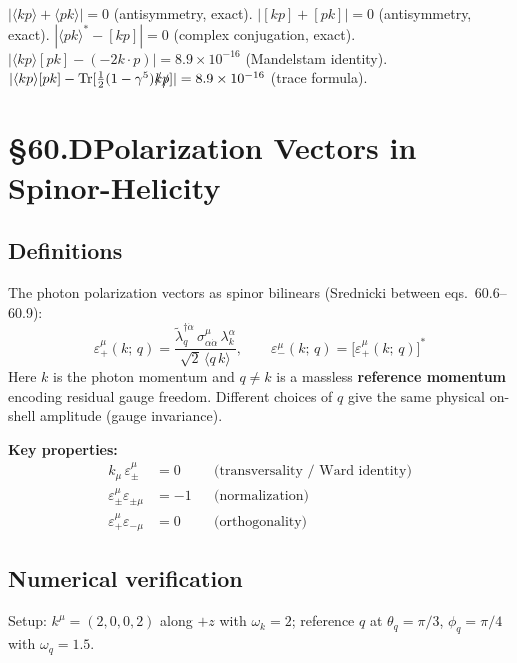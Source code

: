 \documentclass[12pt]{article}
\newcommand{\verified}[1]{\textcolor{verifygreen}{\checkmark\; #1}}
\begin{document}
\verified{$|\langle kp\rangle + \langle pk\rangle| = 0$ (antisymmetry, exact).}
\verified{$|[kp] + [pk]| = 0$ (antisymmetry, exact).}
\verified{$|\langle pk\rangle^* - [kp]| = 0$ (complex conjugation, exact).}
\verified{$|\langle kp\rangle[pk] - (-2k\cdot p)| = 8.9\times10^{-16}$ (Mandelstam identity).}
\verified{$|\langle kp\rangle[pk] - \mathrm{Tr}[\tfrac12(1-\gamma^5)\slashed{k}\slashed{p}]| = 8.9\times10^{-16}$ (trace formula).}

\section{§60.D\quad Polarization Vectors in Spinor-Helicity}

\subsection{Definitions}

The photon polarization vectors as spinor bilinears
(Srednicki between eqs.~60.6--60.9):
\begin{equation}
  \boxed{
    \varepsilon_+^\mu(k;\,q) = \frac{\tilde\lambda_q^{\dagger\dot\alpha}\,\sigma^\mu_{\alpha\dot\alpha}\,\lambda_k^\alpha}{\sqrt{2}\,\langle q\,k\rangle},
    \qquad
    \varepsilon_-^\mu(k;\,q) = \bigl[\varepsilon_+^\mu(k;\,q)\bigr]^*
  }
  \tag{60.6}
\end{equation}
Here $k$ is the photon momentum and $q\neq k$ is a massless \textbf{reference
momentum} encoding residual gauge freedom.  Different choices of $q$ give the
same physical on-shell amplitude (gauge invariance).

\textbf{Key properties:}
\begin{align}
  k_\mu\,\varepsilon_\pm^\mu &= 0
  &&\text{(transversality / Ward identity)}
  \tag{60.7}\\
  \varepsilon_\pm^\mu\varepsilon_{\pm\mu} &= -1
  &&\text{(normalization)}
  \tag{60.8}\\
  \varepsilon_+^\mu\varepsilon_{-\mu} &= 0
  &&\text{(orthogonality)}
  \tag{60.9}
\end{align}

\subsection{Numerical verification}

Setup: $k^\mu=(2,0,0,2)$ along $+z$ with $\omega_k=2$; reference $q$ at
$\theta_q=\pi/3$, $\phi_q=\pi/4$ with $\omega_q=1.5$.
\end{document}
